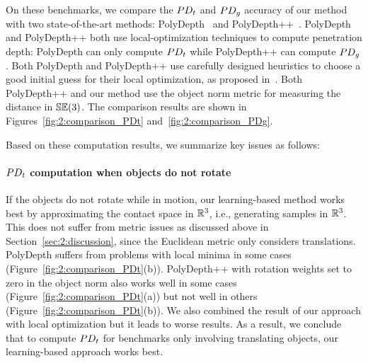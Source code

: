 On these benchmarks, we compare the $PD_t$ and $PD_g$ accuracy of our method with two state-of-the-art methods: PolyDepth~\cite{Je:2012:PRP} and PolyDepth++~\cite{Tang:2012:IGP}. PolyDepth and PolyDepth++ both use local-optimization techniques to compute penetration depth: PolyDepth can only compute $PD_t$ while PolyDepth++ can compute $PD_g$. Both PolyDepth and PolyDepth++ use carefully designed heuristics to choose a good initial guess for their local optimization, as proposed in~\cite{Je:2012:PRP}. Both PolyDepth++ and our method use the object norm metric for measuring the distance in $\mathbb {SE}(3)$. The comparison results are shown in Figures~\ref{fig:2:comparison_PDt} and~\ref{fig:2:comparison_PDg}.

Based on these computation results, we summarize key issues as follows:

\paragraph{$PD_t$ computation when objects do not rotate} If the objects do not rotate while in motion, our learning-based method works best by approximating the contact space in $\mathbb R^3$, i.e., generating samples in $\mathbb R^3$. This does not suffer from metric issues as discussed above in Section~\ref{sec:2:discussion}, since the Euclidean metric only considers translations. PolyDepth suffers from problems with local minima in some cases (Figure~\ref{fig:2:comparison_PDt}(b)). PolyDepth++ with rotation weights set to zero in the object norm also works well in some cases (Figure~\ref{fig:2:comparison_PDt}(a)) but not well in others (Figure~\ref{fig:2:comparison_PDt}(b)). We also combined the result of our approach with local optimization but it leads to worse results. As a result, we conclude that to compute $PD_t$ for benchmarks only involving translating objects, our learning-based approach works best.

